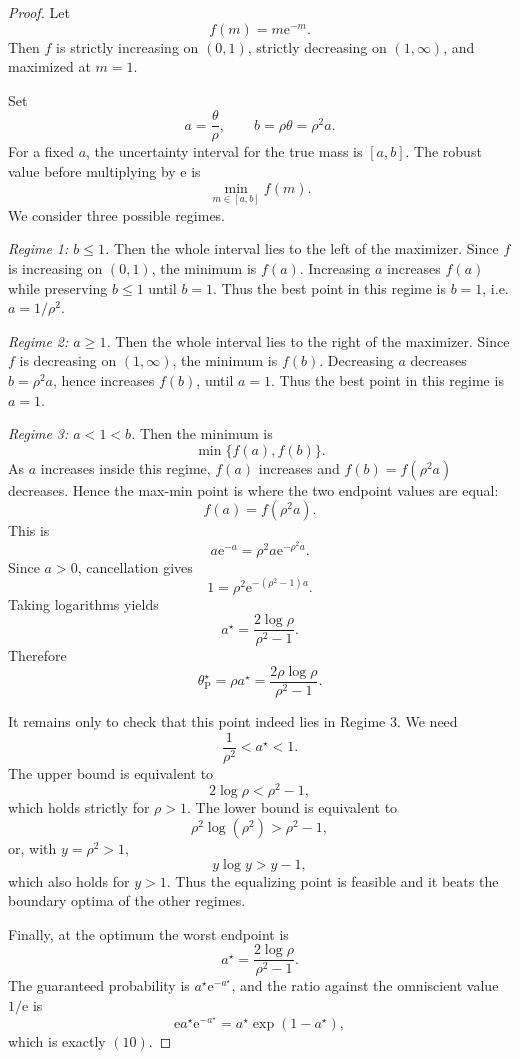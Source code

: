 \documentclass[11pt,a4paper]{article}
\newcommand{\e}{\mathrm e}
\begin{document}
\begin{proof}
Let
\[
  f(m)=m\e^{-m}.
\]
Then \(f\) is strictly increasing on \((0,1)\), strictly decreasing on
\((1,\infty)\), and maximized at \(m=1\).

Set
\[
  a=\frac{\theta}{\rho},
  \qquad
  b=\rho\theta=\rho^2a.
\]
For a fixed \(a\), the uncertainty interval for the true mass is \([a,b]\).  The
robust value before multiplying by \(\e\) is
\[
  \min_{m\in[a,b]}f(m).
\]
We consider three possible regimes.

\medskip
\noindent\emph{Regime 1: \(b\le1\).}
Then the whole interval lies to the left of the maximizer.  Since \(f\) is
increasing on \((0,1)\), the minimum is \(f(a)\).  Increasing \(a\) increases
\(f(a)\) while preserving \(b\le1\) until \(b=1\).  Thus the best point in this
regime is \(b=1\), i.e. \(a=1/\rho^2\).

\medskip
\noindent\emph{Regime 2: \(a\ge1\).}
Then the whole interval lies to the right of the maximizer.  Since \(f\) is
decreasing on \((1,\infty)\), the minimum is \(f(b)\).  Decreasing \(a\) decreases
\(b=\rho^2a\), hence increases \(f(b)\), until \(a=1\).  Thus the best point in
this regime is \(a=1\).

\medskip
\noindent\emph{Regime 3: \(a<1<b\).}
Then the minimum is
\[
  \min\{f(a),f(b)\}.
\]
As \(a\) increases inside this regime, \(f(a)\) increases and
\(f(b)=f(\rho^2a)\) decreases.  Hence the max-min point is where the two endpoint
values are equal:
\[
  f(a)=f(\rho^2a).
\]
This is
\[
  a\e^{-a}=\rho^2a\e^{-\rho^2a}.
\]
Since \(a>0\), cancellation gives
\[
  1=\rho^2\e^{-(\rho^2-1)a}.
\]
Taking logarithms yields
\[
  a^\star=\frac{2\log\rho}{\rho^2-1}.
\]
Therefore
\[
  \theta^\star_{\mathrm P}=\rho a^\star
  =\frac{2\rho\log\rho}{\rho^2-1}.
\]

It remains only to check that this point indeed lies in Regime 3.  We need
\[
  \frac1{\rho^2}<a^\star<1.
\]
The upper bound is equivalent to
\[
  2\log\rho<\rho^2-1,
\]
which holds strictly for \(\rho>1\).  The lower bound is equivalent to
\[
  \rho^2\log(\rho^2)>\rho^2-1,
\]
or, with \(y=\rho^2>1\),
\[
  y\log y>y-1,
\]
which also holds for \(y>1\).  Thus the equalizing point is feasible and it
beats the boundary optima of the other regimes.

Finally, at the optimum the worst endpoint is
\[
  a^\star=\frac{2\log\rho}{\rho^2-1}.
\]
The guaranteed probability is \(a^\star\e^{-a^\star}\), and the ratio against the
omniscient value \(1/\e\) is
\[
  \e a^\star\e^{-a^\star}
  =a^\star\exp(1-a^\star),
\]
which is exactly \((10)\).
\end{proof}
\end{document}
